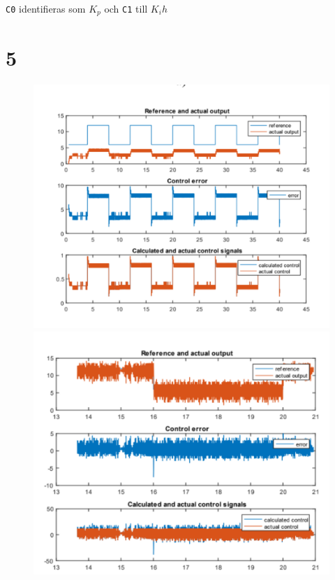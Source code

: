 \documentclass[11pt]{article}
\begin{document}
\texttt{C0} identifieras som $K_p$ och \texttt{C1} till $K_ih$
\newpage
\section{5}
\begin{figure}[h!]
\centering
\includegraphics[scale=1]{Figures/1}
\includegraphics[scale=1]{Figures/2}

\end{figure}
\end{document}
